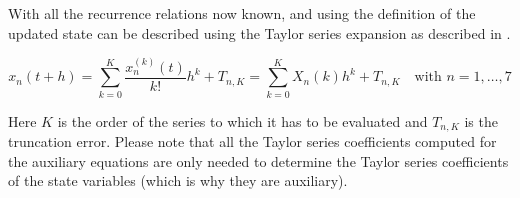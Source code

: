 With all the recurrence relations now known, and using the definition of  the updated state can be described using the Taylor series expansion as described in .

\begin{equation} \label{eq:TSexp}
x_{n}\left(t+h\right)=\displaystyle\sum_{k=0}^{K}\dfrac{x_{n}^{\left( k\right)}\left(t\right)}{k!}h^{k}+T_{n,K}=\displaystyle\sum_{k=0}^{K}X_{n}\left( k \right) h^{k}+T_{n,K} \quad \text{with }n=1,\dotsc,7
\end{equation}

Here $K$ is the order of the series to which it has to be evaluated and $T_{n,K}$ is the truncation error. Please note that all the Taylor series coefficients computed for the auxiliary equations are only needed to determine the Taylor series coefficients of the state variables (which is why they are auxiliary).





%


%



